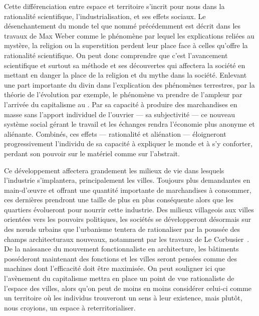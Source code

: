 Cette différenciation entre espace et territoire s'incrit pour nous dans la rationalité scientifique, l'industrialisation, et ses effets sociaux.
Le désenchantement du monde tel que nommé précédemment est décrit dans les travaux de Max Weber comme le phénomène par lequel les explications reliées au mystère, la religion ou la superstition perdent leur place face à celles qu'offre la rationalité scientifique\citep[62]{Weber1963}.
On peut donc comprendre que c'est l'avancement scientifique et surtout sa méthode et ses découvertes qui affectera la société en mettant en danger la place de la religion et du mythe dans la société.
Enlevant une part importante du divin dans l'explication des phénomènes terrestres, par la théorie de l'évolution par exemple, le phénomène va prendre de l'ampleur par l'arrivée du capitalisme au .
Par sa capacité à produire des marchandises en masse sans l'apport individuel de l'ouvrier --- sa subjectivité --- ce nouveau système social gérant le travail et les échanges rendra l'économie plus anonyme et aliénante.
Combinés, ces effets --- rationalité et aliénation --- éloigneront progressivement l'individu de sa capacité à expliquer le monde et à s'y conforter, perdant son pouvoir sur le matériel comme sur l'abstrait.

Ce développement affectera grandement les milieux de vie dans lesquels l'industrie s'implantera, principalement les villes.
Toujours plus demandantes en main-d’œuvre et offrant une quantité importante de marchandises à consommer, ces dernières prendront une taille de plus en plus conséquente alors que les quartiers évolueront pour nourrir cette industrie.
Des milieux villageois aux villes orientées vers les pouvoirs politiques, les sociétés se développeront désormais sur des nœuds urbains que l'urbanisme tentera de rationaliser par la poussée des champs architecturaux nouveaux, notamment par les travaux de Le Corbusier~\citep[170]{Pacione2009}.
De la naissance du mouvement fonctionnaliste en architecture, les bâtiments posséderont maintenant des fonctions et les villes seront pensées comme des machines dont l'efficacité doit être maximisée\citep[158]{Pacione2009}.
On peut souligner ici que l'avènement du capitalisme mettra en place un point de vue rationaliste de l'espace des villes, alors qu'on peut de moins en moins considérer celui-ci comme un territoire où les individus trouveront un sens à leur existence, mais plutôt, nous croyions, un espace à reterritorialiser.

